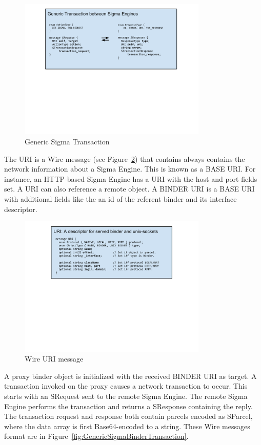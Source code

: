 \documentclass[prodmode]{acmlarge}
\begin{document}
\begin{figure}[h!]
\centering
\includegraphics[width=0.8\textwidth]{drawings/WireTransaction.pdf}
\caption{Generic Sigma Transaction}
\label{fig:GenericSigmaTransaction}
\end{figure}

The URI is a Wire message (see Figure~\ref{fig:WireURI}) that contains always contains the network information about a Sigma Engine. This is known as a BASE URI. For instance, an HTTP-based Sigma Engine has a URI with the host and port fields set. A URI can also reference a remote object. A BINDER URI is a BASE URI with additional fields like the an id of the referent binder and its interface descriptor.

\begin{figure}[h!]
\centering
\includegraphics[width=0.8\textwidth]{drawings/WireURI.pdf}
\caption{Wire URI message}
\label{fig:WireURI}
\end{figure}

A proxy binder object is initialized with the received BINDER URI as target. A transaction invoked on the proxy causes a network transaction to occur. This starts with an SRequest sent to the remote Sigma Engine. The remote Sigma Engine performs the transaction and returns a SResponse containing the reply. The transaction request and response both contain parcels encoded as SParcel, where the data array is first Base64-encoded to a string. These Wire messages format are in Figure~\ref{fig:GenericSigmaBinderTransaction}.
\end{document}
